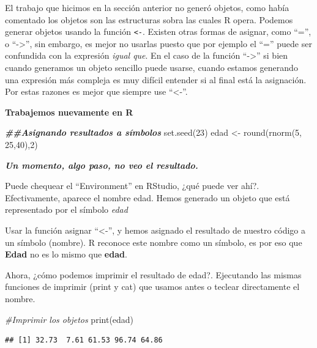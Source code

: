 \documentclass[
]{article}
\newenvironment{Shaded}{\begin{snugshade}}{\end{snugshade}}
\newcommand{\CommentTok}[1]{\textcolor[rgb]{0.56,0.35,0.01}{\textit{#1}}}
\newcommand{\DecValTok}[1]{\textcolor[rgb]{0.00,0.00,0.81}{#1}}
\newcommand{\DocumentationTok}[1]{\textcolor[rgb]{0.56,0.35,0.01}{\textbf{\textit{#1}}}}
\newcommand{\FunctionTok}[1]{\textcolor[rgb]{0.00,0.00,0.00}{#1}}
\newcommand{\NormalTok}[1]{#1}
\newcommand{\OtherTok}[1]{\textcolor[rgb]{0.56,0.35,0.01}{#1}}
\begin{document}
El trabajo que hicimos en la sección anterior no generó objetos, como
había comentado los objetos son las estructuras sobra las cuales R
opera. Podemos generar objetos usando la función \texttt{\textless{}-}.
Existen otras formas de asignar, como ``='', o ``-\textgreater{}'', sin
embargo, es mejor no usarlas puesto que por ejemplo el ``='' puede ser
confundida con la expresión \emph{igual que}. En el caso de la función
``-\textgreater{}'' si bien cuando generamos un objeto sencillo puede
usarse, cuando estamos generando una expresión más compleja es muy
difícil entender si al final está la asignación. Por estas razones es
mejor que siempre use ``\textless-''.

\textbf{Trabajemos nuevamente en R}

\begin{Shaded}
\begin{Highlighting}[]
\DocumentationTok{\#\#Asignando resultados a símbolos}
\FunctionTok{set.seed}\NormalTok{(}\DecValTok{23}\NormalTok{)}
\NormalTok{edad }\OtherTok{\textless{}{-}} \FunctionTok{round}\NormalTok{(}\FunctionTok{rnorm}\NormalTok{(}\DecValTok{5}\NormalTok{, }\DecValTok{25}\NormalTok{,}\DecValTok{40}\NormalTok{),}\DecValTok{2}\NormalTok{)}
\end{Highlighting}
\end{Shaded}

\emph{\textbf{Un momento, algo paso, no veo el resultado.}}

Puede chequear el ``Environment'' en RStudio, ¿qué puede ver ahí?.
Efectivamente, aparece el nombre edad. Hemos generado un objeto que está
representado por el símbolo \emph{edad}

Usar la función asignar ``\textless-'', y hemos asignado el resultado de
nuestro código a un símbolo (nombre). R reconoce este nombre como un
símbolo, es por eso que \textbf{Edad} no es lo mismo que \textbf{edad}.

Ahora, ¿cómo podemos imprimir el resultado de edad?. Ejecutando las
mismas funciones de imprimir (print y cat) que usamos antes o teclear
directamente el nombre.

\begin{Shaded}
\begin{Highlighting}[]
\CommentTok{\#Imprimir los objetos}
\FunctionTok{print}\NormalTok{(edad)}
\end{Highlighting}
\end{Shaded}

\begin{verbatim}
## [1] 32.73  7.61 61.53 96.74 64.86
\end{verbatim}
\end{document}
